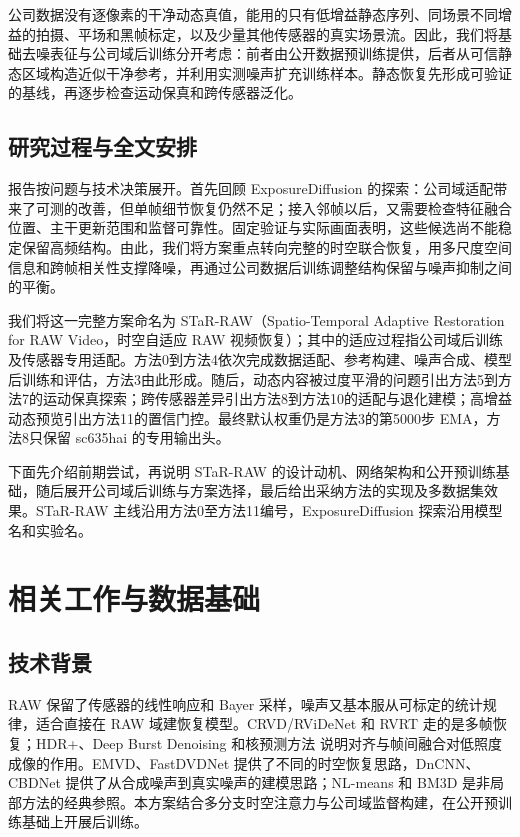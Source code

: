 \documentclass[11pt,a4paper,UTF8,fontset=fandol]{ctexart}
\begin{document}
公司数据没有逐像素的干净动态真值，能用的只有低增益静态序列、同场景不同增益的拍摄、平场和黑帧标定，以及少量其他传感器的真实场景流。因此，我们将基础去噪表征与公司域后训练分开考虑：前者由公开数据预训练提供，后者从可信静态区域构造近似干净参考，并利用实测噪声扩充训练样本。静态恢复先形成可验证的基线，再逐步检查运动保真和跨传感器泛化。

\subsection{研究过程与全文安排}

报告按问题与技术决策展开。首先回顾 ExposureDiffusion 的探索：公司域适配带来了可测的改善，但单帧细节恢复仍然不足；接入邻帧以后，又需要检查特征融合位置、主干更新范围和监督可靠性。固定验证与实际画面表明，这些候选尚不能稳定保留高频结构。由此，我们将方案重点转向完整的时空联合恢复，用多尺度空间信息和跨帧相关性支撑降噪，再通过公司数据后训练调整结构保留与噪声抑制之间的平衡。

我们将这一完整方案命名为 STaR-RAW（Spatio-Temporal Adaptive Restoration for RAW Video，时空自适应 RAW 视频恢复）；其中的适应过程指公司域后训练及传感器专用适配。方法0到方法4依次完成数据适配、参考构建、噪声合成、模型后训练和评估，方法3由此形成。随后，动态内容被过度平滑的问题引出方法5到方法7的运动保真探索；跨传感器差异引出方法8到方法10的适配与退化建模；高增益动态预览引出方法11的置信门控。最终默认权重仍是方法3的第5000步 EMA，方法8只保留 sc635hai 的专用输出头。

下面先介绍前期尝试，再说明 STaR-RAW 的设计动机、网络架构和公开预训练基础，随后展开公司域后训练与方案选择，最后给出采纳方法的实现及多数据集效果。STaR-RAW 主线沿用方法0至方法11编号，ExposureDiffusion 探索沿用模型名和实验名。

\section{相关工作与数据基础}

\subsection{技术背景}

RAW 保留了传感器的线性响应和 Bayer 采样，噪声又基本服从可标定的统计规律，适合直接在 RAW 域建恢复模型。CRVD/RViDeNet\cite{r1} 和 RVRT\cite{r3} 走的是多帧恢复；HDR+\cite{r10}、Deep Burst Denoising\cite{r9} 和核预测方法\cite{r17} 说明对齐与帧间融合对低照度成像的作用。EMVD\cite{r15}、FastDVDNet\cite{r16} 提供了不同的时空恢复思路，DnCNN\cite{r14}、CBDNet\cite{r20} 提供了从合成噪声到真实噪声的建模思路；NL-means\cite{r18} 和 BM3D\cite{r19} 是非局部方法的经典参照。本方案结合多分支时空注意力与公司域监督构建，在公开预训练基础上开展后训练。
\end{document}
